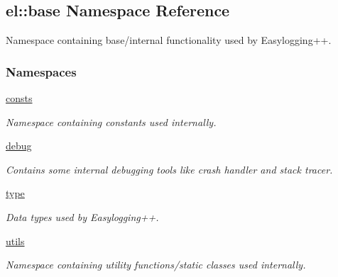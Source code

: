 \hypertarget{a00184}{}\subsection{el\+:\+:base Namespace Reference}
\label{a00184}


Namespace containing base/internal functionality used by Easylogging++.  


\subsubsection*{Namespaces}
\begin{DoxyCompactItemize}
\item 
 \hyperlink{a00185}{consts}
\begin{DoxyCompactList}\small\item\em Namespace containing constants used internally. \end{DoxyCompactList}\item 
 \hyperlink{a00186}{debug}
\begin{DoxyCompactList}\small\item\em Contains some internal debugging tools like crash handler and stack tracer. \end{DoxyCompactList}\item 
 \hyperlink{a00189}{type}
\begin{DoxyCompactList}\small\item\em Data types used by Easylogging++. \end{DoxyCompactList}\item 
 \hyperlink{a00190}{utils}
\begin{DoxyCompactList}\small\item\em Namespace containing utility functions/static classes used internally. \end{DoxyCompactList}\end{DoxyCompactItemize}
